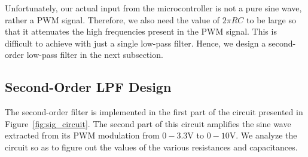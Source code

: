 Unfortunately, our actual input from the microcontroller is not a pure sine
wave, rather a PWM signal. Therefore, we also need the value of $2\pi RC$ to be
large so that it attenuates the high frequencies present in the PWM signal. This
is difficult to achieve with just a single low-pass filter. Hence, we design a
second-order low-pass filter in the next subsection.

\vspace{-1em}
\subsection{Second-Order LPF Design}
\label{ssec:second}
\vspace{-1em}

The second-order filter is implemented in the first part of the circuit
presented in Figure~\ref{fig:sig_circuit}. The second part of this circuit
amplifies the sine wave extracted from its PWM modulation from
$0-3.3$\unit{\volt} to $0-10$\unit{\volt}. We analyze the circuit so as to
figure out the values of the various resistances and capacitances.

